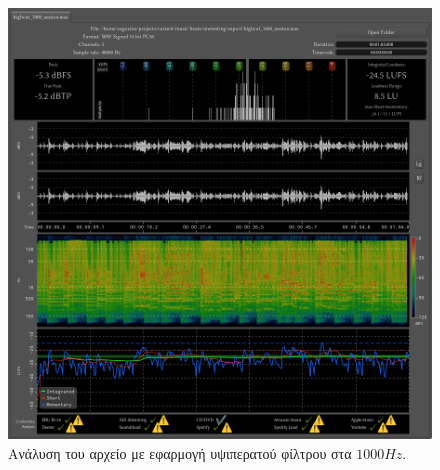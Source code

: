 \documentclass[12pt]{extarticle}
\begin{document}
\begin{figure}[htpb]
    \centering
    \includegraphics[width=\textwidth]{./assets/session_1000_hp.png}
    \caption{Ανάλυση του αρχείο  με εφαρμογή υψιπερατού φίλτρου στα $1000Hz$.}
    \label{fig:sessionanalysishp1000}
\end{figure}


\newpage


\end{document}
